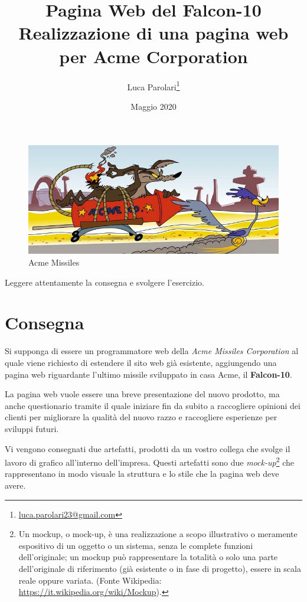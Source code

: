 \documentclass[addpoints,12pt,answers]{exam}
\author{Luca Parolari\footnote{\href{mailto:luca.parolari23@gmail.com}{luca.parolari23@gmail.com}}}
\begin{document}
    
    \title{Pagina Web del Falcon-10\\ \large Realizzazione di una pagina web per Acme Corporation}
    \date{Maggio 2020}
    
    \maketitle
    
    \begin{figure}[H]
        \centering
        \includegraphics[scale=2]{img/acme.jpg}
        \caption{Acme Missiles}
    \end{figure}

    Leggere attentamente la consegna e svolgere l'esercizio.
    
    \section{Consegna}
    Si supponga di essere un programmatore web della \emph{Acme Missiles Corporation} al quale viene richiesto di estendere il sito web già esistente, aggiungendo una pagina web riguardante l'ultimo missile sviluppato in casa Acme, il \textbf{Falcon-10}.

    La pagina web vuole essere una breve presentazione del nuovo prodotto, ma anche questionario tramite il quale iniziare fin da subito a raccogliere opinioni dei clienti per migliorare la qualità del nuovo razzo e raccogliere esperienze per sviluppi futuri.

    Vi vengono consegnati due artefatti, prodotti da un vostro collega che svolge il lavoro di grafico all'interno dell'impresa. Questi  artefatti sono due \emph{mock-up}\footnote{Un mockup, o mock-up, è una realizzazione a scopo illustrativo o meramente espositivo di un oggetto o un sistema, senza le complete funzioni dell'originale; un mockup può rappresentare la totalità o solo una parte dell'originale di riferimento (già esistente o in fase di progetto), essere in scala reale oppure variata. (Fonte Wikipedia: \href{https://it.wikipedia.org/wiki/Mockup}{https://it.wikipedia.org/wiki/Mockup}).} che rappresentano in modo visuale la struttura e lo stile che la pagina web deve avere.
\end{document}
